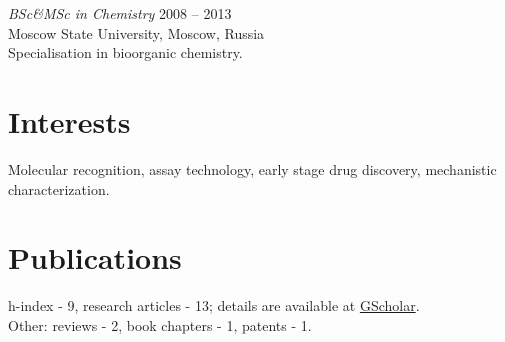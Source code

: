 \documentclass[margin]{res}
\begin{document}
\begin{resume}
            {\sl BSc\&MSc in Chemistry} \hfill 2008 -- 2013 \\
            Moscow State University, Moscow, Russia \\
            Specialisation in bioorganic chemistry.
                        
        \section{Interests} Molecular recognition, assay technology, early stage drug discovery, mechanistic characterization.
        
        \section{Publications}

            \nocite{*}
            h-index - 9, research articles - 13; details are available at \href{https://scholar.google.com/citations?hl=sv&user=H5uK2zsAAAAJ&view_op=list_works&authuser=2&sortby=pubdate}{GScholar}.\\
            Other: reviews - 2, book chapters - 1, patents - 1.\\
            

    \end{resume}
\end{document}

